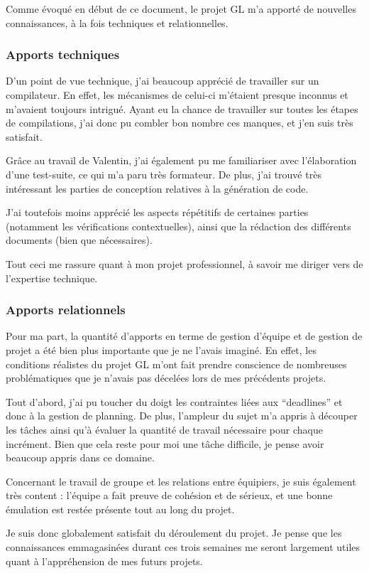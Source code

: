 Comme évoqué en début de ce document, le projet GL m'a apporté de nouvelles connaissances, à la fois techniques et relationnelles.

\subsubsection{Apports techniques}

D'un point de vue technique, j'ai beaucoup apprécié de travailler sur un compilateur. En effet, les mécanismes de celui-ci m'étaient presque inconnus et m'avaient toujours intrigué. Ayant eu la chance de travailler sur toutes les étapes de compilations, j'ai donc pu combler bon nombre ces manques, et j'en suis très satisfait.

Grâce au travail de Valentin, j'ai également pu me familiariser avec l'élaboration d'une test-suite, ce qui m'a paru très formateur. De plus, j'ai trouvé très intéressant les parties de conception relatives à la génération de code.

J'ai toutefois moins apprécié les aspects répétitifs de certaines parties (notamment les vérifications contextuelles), ainsi que la rédaction des différents documents (bien que nécessaires).

Tout ceci me rassure quant à mon projet professionnel, à savoir me diriger vers de l'expertise technique.

\subsubsection{Apports relationnels}

Pour ma part, la quantité d'apports en terme de gestion d'équipe et de gestion de projet a été bien plus importante que je ne l'avais imaginé.
En effet, les conditions réalistes du projet GL m'ont fait prendre conscience de nombreuses problématiques que je n'avais pas décelées lors de mes précédents projets.

Tout d'abord, j'ai pu toucher du doigt les contraintes liées aux ``deadlines'' et donc à la gestion de planning. De plus, l'ampleur du sujet m'a appris à découper les tâches ainsi qu'à évaluer la quantité de travail nécessaire pour chaque incrément. Bien que cela reste pour moi une tâche difficile, je pense avoir beaucoup appris dans ce domaine.

Concernant le travail de groupe et les relations entre équipiers, je suis également très content : l'équipe a fait preuve de cohésion et de sérieux, et une bonne émulation est restée présente tout au long du projet.

Je suis donc globalement satisfait du déroulement du projet. Je pense que les connaissances emmagasinées durant ces trois semaines me seront largement utiles quant à l'appréhension de mes futurs projets.
